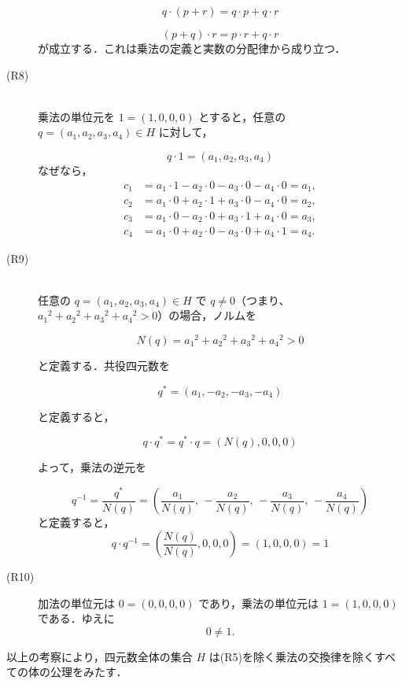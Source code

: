 \begin{tproof}
\begin{description}
              \[
                  q \cdot (p + r) = q \cdot p + q \cdot r
              \]

              \[
                  (p + q) \cdot r = p \cdot r + q \cdot r
              \]
              が成立する．これは乗法の定義と実数の分配律から成り立つ．
        \item [(R8)] \mbox{} \\
              乗法の単位元を $1 = (1, 0, 0, 0)$ とすると，任意の $q = (a_1, a_2, a_3, a_4) \in H$ に対して，

              \[
                  q \cdot 1 = (a_1, a_2, a_3, a_4)
              \]
              なぜなら，
              \begin{align*}
                  c_1 & = a_1 \cdot 1 - a_2 \cdot 0 - a_3 \cdot 0 - a_4 \cdot 0 = a_1, \\
                  c_2 & = a_1 \cdot 0 + a_2 \cdot 1 + a_3 \cdot 0 - a_4 \cdot 0 = a_2, \\
                  c_3 & = a_1 \cdot 0 - a_2 \cdot 0 + a_3 \cdot 1 + a_4 \cdot 0 = a_3, \\
                  c_4 & = a_1 \cdot 0 + a_2 \cdot 0 - a_3 \cdot 0 + a_4 \cdot 1 = a_4.
              \end{align*}
        \item [(R9)] \mbox{} \\
              任意の $q = (a_1, a_2, a_3, a_4) \in H$ で $q \ne 0$（つまり、${a_1}^2 + {a_2}^2 + {a_3}^2 + {a_4}^2 > 0$）の場合，ノルムを

              \[
                  N(q) = {a_1}^2 + {a_2}^2 + {a_3}^2 + {a_4}^2 > 0
              \]

              と定義する．共役四元数を

              \[
                  q^* = (a_1, -a_2, -a_3, -a_4)
              \]

              と定義すると，

              \[
                  q \cdot q^* = q^* \cdot q = (N(q), 0, 0, 0)
              \]

              よって，乗法の逆元を

              \[
                  q^{-1} = \frac{q^*}{N(q)} = \left( \frac{a_1}{N(q)},\, -\frac{a_2}{N(q)},\, -\frac{a_3}{N(q)},\, -\frac{a_4}{N(q)} \right)
              \]
              と定義すると，
              \[
                  q \cdot q^{-1} = \left( \frac{N(q)}{N(q)}, 0, 0, 0 \right) = (1, 0, 0, 0) = 1
              \]
        \item [(R10)]
              加法の単位元は $0 = (0, 0, 0, 0)$ であり，乗法の単位元は $1 = (1, 0, 0, 0)$ である．ゆえに
              \[
                  0 \ne 1.
              \]
    \end{description}
    以上の考察により，四元数全体の集合 $H$ は(R5)を除く乗法の交換律を除くすべての体の公理をみたす．
\end{tproof}
\newpage

